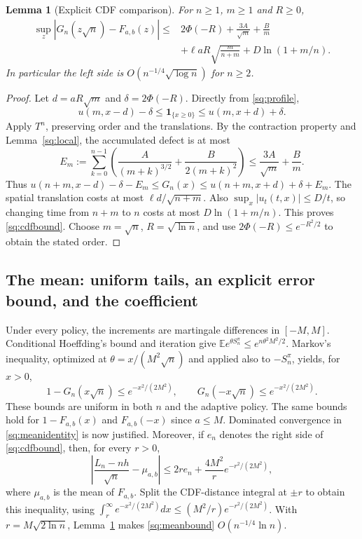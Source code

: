 \documentclass[11pt,a4paper]{article}
\newtheorem{lemma}[theorem]{Lemma}
\theoremstyle{definition}\newtheorem{definition}[theorem]{Definition}
\theoremstyle{remark}\newtheorem{remark}[theorem]{Remark}
\newcommand{\E}{\mathbb E}
\numberwithin{equation}{section}
\begin{document}
\begin{lemma}[Explicit CDF comparison]\label{sq:cdf}
For $n\ge1$, $m\ge1$ and $R\ge0$,
\begin{align}\label{sq:cdfbound}
 \sup_z|G_n(z\sqrt n)-F_{a,b}(z)|\le{}&2\Phi(-R)
   +\frac{3A}{\sqrt m}+\frac Bm\\
 &+\ell aR\sqrt{\frac m{n+m}}
   +D\ln(1+m/n).\nonumber
\end{align}
In particular the left side is $O(n^{-1/4}\sqrt{\log n})$ for $n\ge2$.
\end{lemma}
\begin{proof}
Let $d=aR\sqrt m$ and $\delta=2\Phi(-R)$. Directly from \eqref{sq:profile},
\[
 u(m,x-d)-\delta\le\mathbf1_{\{x\ge0\}}
                       \le u(m,x+d)+\delta.
\]
Apply $T^n$, preserving order and the translations. By the contraction
property and Lemma~\ref{sq:local}, the accumulated defect is at most
\[
 E_m:=\sum_{k=0}^{n-1}\left(\frac A{(m+k)^{3/2}}
                         +\frac B{2(m+k)^2}\right)
 \le\frac{3A}{\sqrt m}+\frac Bm.
\]
Thus $u(n+m,x-d)-\delta-E_m\le G_n(x)
\le u(n+m,x+d)+\delta+E_m$.
The spatial translation costs at most $\ell d/\sqrt{n+m}$.
Also $\sup_x|u_t(t,x)|\le D/t$, so changing time from $n+m$ to $n$
costs at most $D\ln(1+m/n)$. This proves \eqref{sq:cdfbound}.
Choose $m=\sqrt n$, $R=\sqrt{\ln n}$, and use
$2\Phi(-R)\le e^{-R^2/2}$ to obtain the stated order.
\end{proof}

\subsection{The mean: uniform tails, an explicit error bound, and the coefficient}
Under every policy, the increments are martingale differences in $[-M,M]$.
Conditional Hoeffding's bound and iteration give
$\E e^{\theta S_n^\pi}\le e^{n\theta^2M^2/2}$.
Markov's inequality, optimized at $\theta=x/(M^2\sqrt n)$ and applied also
to $-S_n^\pi$, yields, for $x>0$,
\begin{equation}\label{sq:tails}
 1-G_n(x\sqrt n)\le e^{-x^2/(2M^2)},\qquad
 G_n(-x\sqrt n)\le e^{-x^2/(2M^2)}.
\end{equation}
These bounds are uniform in both $n$ and the adaptive policy. The same
bounds hold for $1-F_{a,b}(x)$ and $F_{a,b}(-x)$ since $a\le M$.
Dominated convergence in \eqref{sq:meanidentity} is now justified.
Moreover, if $e_n$ denotes the right side of \eqref{sq:cdfbound}, then, for every $r>0$,
\begin{equation}\label{sq:meanbound}
 \left|\frac{L_n-nh}{\sqrt n}-\mu_{a,b}\right|
 \le 2r e_n+\frac{4M^2}{r}e^{-r^2/(2M^2)},
\end{equation}
where $\mu_{a,b}$ is the mean of $F_{a,b}$. Split the CDF-distance integral
at $\pm r$ to obtain this inequality, using
$\int_r^\infty e^{-x^2/(2M^2)}dx\le(M^2/r)e^{-r^2/(2M^2)}$.
With $r=M\sqrt{2\ln n}$, Lemma~\ref{sq:cdf} makes \eqref{sq:meanbound}
$O(n^{-1/4}\ln n)$.
\end{document}
